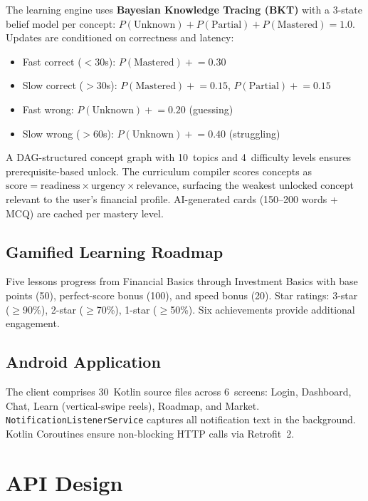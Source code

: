\documentclass[conference]{IEEEtran}
\begin{document}
The learning engine uses \textbf{Bayesian Knowledge Tracing (BKT)} with a 3-state belief model per concept: $P(\text{Unknown}) + P(\text{Partial}) + P(\text{Mastered}) = 1.0$. Updates are conditioned on correctness and latency:
\begin{itemize}
  \item Fast correct ($<30$s): $P(\text{Mastered}) \mathrel{+}= 0.30$
  \item Slow correct ($>30$s): $P(\text{Mastered}) \mathrel{+}= 0.15$, $P(\text{Partial}) \mathrel{+}= 0.15$
  \item Fast wrong: $P(\text{Unknown}) \mathrel{+}= 0.20$ (guessing)
  \item Slow wrong ($>60$s): $P(\text{Unknown}) \mathrel{+}= 0.40$ (struggling)
\end{itemize}

A DAG-structured concept graph with 10~topics and 4~difficulty levels ensures prerequisite-based unlock. The curriculum compiler scores concepts as $\text{score} = \text{readiness} \times \text{urgency} \times \text{relevance}$, surfacing the weakest unlocked concept relevant to the user's financial profile. AI-generated cards (150--200 words + MCQ) are cached per mastery level.

\subsection{Gamified Learning Roadmap}

Five lessons progress from Financial Basics through Investment Basics with base points (50), perfect-score bonus (100), and speed bonus (20). Star ratings: 3-star ($\geq$90\%), 2-star ($\geq$70\%), 1-star ($\geq$50\%). Six achievements provide additional engagement.

\subsection{Android Application}

The client comprises 30~Kotlin source files across 6~screens: Login, Dashboard, Chat, Learn (vertical-swipe reels), Roadmap, and Market. \texttt{NotificationListenerService} captures all notification text in the background. Kotlin Coroutines ensure non-blocking HTTP calls via Retrofit~2.

\section{API Design}
\end{document}
